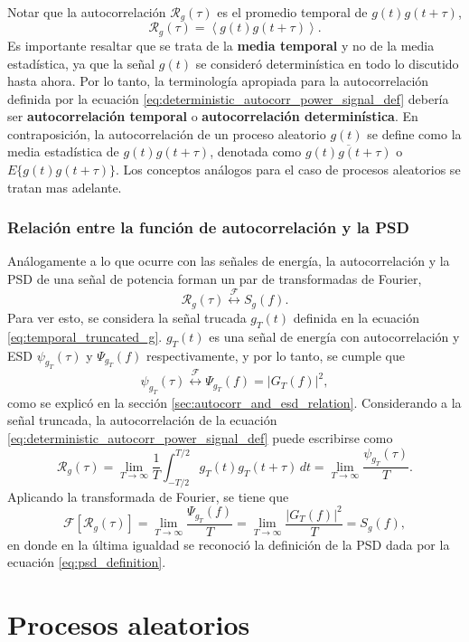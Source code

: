 \documentclass[a4paper]{article}
\begin{document}
Notar que la autocorrelación \(\mathcal{R}_g(\tau)\) es el promedio temporal de \(g(t)g(t+\tau)\),
\[
 \mathcal{R}_g(\tau) = \left<g(t)g(t+\tau)\right>.
\]
Es importante resaltar que se trata de la \textbf{media temporal} y no de la media estadística, ya que la señal \(g(t)\) se consideró determinística en todo lo discutido hasta ahora. Por lo tanto, la terminología apropiada para la autocorrelación definida por la ecuación \ref{eq:deterministic_autocorr_power_signal_def} debería ser \textbf{autocorrelación temporal} o \textbf{autocorrelación determinística}. En contraposición, la autocorrelación de un proceso aleatorio \(g(t)\) se define como la media estadística de  \(g(t)g(t+\tau)\), denotada como   \(\overline{g(t)g(t+\tau)}\) o \(E\{g(t)g(t+\tau)\}\). Los conceptos análogos para el caso de procesos aleatorios se tratan mas adelante.

\subsubsection{Relación entre la función de autocorrelación y la PSD}\label{sec:autocorr_and_psd_relation}

Análogamente a lo que ocurre con las señales de energía, la autocorrelación y la PSD de una señal de potencia forman un par de transformadas de Fourier,
\[
 \mathcal{R}_g(\tau)\overset{\mathcal{F}}{\longleftrightarrow}S_g(f).
\]
Para ver esto, se considera la señal trucada \(g_T(t)\) definida en la ecuación \ref{eq:temporal_truncated_g}. \(g_T(t)\) es una señal de energía con autocorrelación y ESD \(\psi_{g_T}(\tau)\) y \(\Psi_{g_T}(f)\) respectivamente, y por lo tanto, se cumple que
\[
 \psi_{g_T}(\tau)\overset{\mathcal{F}}{\longleftrightarrow}\Psi_{g_T}(f)=|G_T(f)|^2,
\]
como se explicó en la sección \ref{sec:autocorr_and_esd_relation}. Considerando a la señal truncada, la autocorrelación de la ecuación \ref{eq:deterministic_autocorr_power_signal_def} puede escribirse como
\[
 \mathcal{R}_g(\tau)=\lim_{T\to\infty}\frac{1}{T}\int_{-T/2}^{T/2}g_T(t)g_T(t+\tau)\,dt=\lim_{T\to\infty}\frac{\psi_{g_T}(\tau)}{T}.
\]
Aplicando la transformada de Fourier, se tiene que
\[
  \mathcal{F}\left[\mathcal{R}_g(\tau)\right]=\lim_{T\to\infty}\frac{\Psi_{g_T}(f)}{T}=\lim_{T\to\infty}\frac{|G_T(f)|^2}{T}=S_g(f),
\]
en donde en la última igualdad se reconoció la definición de la PSD dada por la ecuación \ref{eq:psd_definition}.

\section{Procesos aleatorios}
\end{document}
